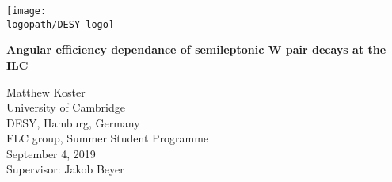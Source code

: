 \begin{titlepage}

  \begin{center}
    \texttt{[image: \\logopath/DESY-logo]}
  \end{center}

  \vspace{0em}

  \begin{minipage}[t]{\textwidth}

    \begin{minipage}{\linewidth}

      \vspace{0em}

      \begin{center}\bfseries\huge
        Angular efficiency dependance of semileptonic W pair decays at the ILC
      \end{center}

      \vspace{1.0 em}

      \begin{center}\large
        Matthew Koster\\
        University of Cambridge\\
        DESY, Hamburg, Germany\\
        FLC group, Summer Student Programme\\[0.5cm]
        September 4, 2019\\[0.5cm]
        Supervisor: Jakob Beyer
      \end{center}

    \end{minipage}
  \end{minipage}

  \vspace{1cm}

  \begin{abstract}
    
  \end{abstract}

\end{titlepage}
